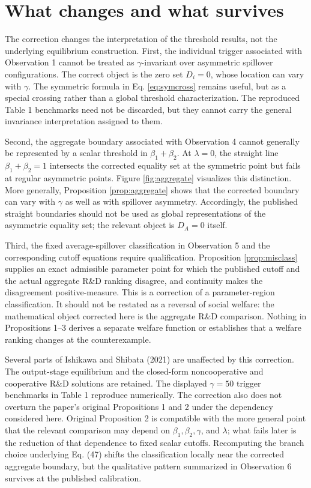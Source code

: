 \section{What changes and what survives}

The correction changes the interpretation of the threshold results, not the underlying equilibrium construction. First, the individual trigger associated with Observation 1 cannot be treated as $\gamma$-invariant over asymmetric spillover configurations. The correct object is the zero set $D_i=0$, whose location can vary with $\gamma$. The symmetric formula in Eq. \eqref{eq:symcross} remains useful, but as a special crossing rather than a global threshold characterization. The reproduced Table 1 benchmarks need not be discarded, but they cannot carry the general invariance interpretation assigned to them.

Second, the aggregate boundary associated with Observation 4 cannot generally be represented by a scalar threshold in $\beta_1+\beta_2$. At $\lambda=0$, the straight line $\beta_1+\beta_2=1$ intersects the corrected equality set at the symmetric point but fails at regular asymmetric points. Figure \ref{fig:aggregate} visualizes this distinction. More generally, Proposition \ref{prop:aggregate} shows that the corrected boundary can vary with $\gamma$ as well as with spillover asymmetry. Accordingly, the published straight boundaries should not be used as global representations of the asymmetric equality set; the relevant object is $D_A=0$ itself.

Third, the fixed average-spillover classification in Observation 5 and the corresponding cutoff equations require qualification. Proposition \ref{prop:misclass} supplies an exact admissible parameter point for which the published cutoff and the actual aggregate R\&D ranking disagree, and continuity makes the disagreement positive-measure. This is a correction of a parameter-region classification. It should not be restated as a reversal of social welfare: the mathematical object corrected here is the aggregate R\&D comparison. Nothing in Propositions 1--3 derives a separate welfare function or establishes that a welfare ranking changes at the counterexample.

Several parts of Ishikawa and Shibata (2021) are unaffected by this correction. The output-stage equilibrium and the closed-form noncooperative and cooperative R\&D solutions are retained. The displayed $\gamma=50$ trigger benchmarks in Table 1 reproduce numerically. The correction also does not overturn the paper's original Propositions 1 and 2 under the dependency considered here. Original Proposition 2 is compatible with the more general point that the relevant comparison may depend on $\beta_1,\beta_2,\gamma$, and $\lambda$; what fails later is the reduction of that dependence to fixed scalar cutoffs. Recomputing the branch choice underlying Eq. (47) shifts the classification locally near the corrected aggregate boundary, but the qualitative pattern summarized in Observation 6 survives at the published calibration.

